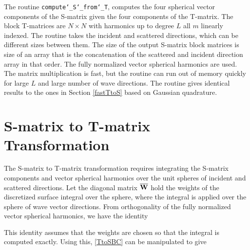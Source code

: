 The routine \texttt{compute\char`_S\char`_from\char`_T}, computes the four spherical vector components of the S-matrix given the four components of the T-matrix. The block T-matrices are $N \times N$ with harmonics up to degree $L$ all $m$ linearly indexed. The routine takes the incident and scattered directions, which can be different sizes between them. The size of the output S-matrix block matrices is size of an array that is the concatenation of the scattered and incident direction array in that order. The fully normalized vector spherical harmonics are used. The matrix multiplication is fast, but the routine can run out of memory quickly for large $L$ and large number of wave directions. The routine gives identical results to the ones in Section \ref{fastTtoS} based on Gaussian quadrature.

{\footnotesize
{}
}


\section{S-matrix to T-matrix Transformation}
\label{secStoT}

The S-matrix to T-matrix transformation requires integrating the S-matrix components and vector spherical harmonics over the unit spheres of incident and scattered directions. Let the diagonal matrix $\overline{\mathbf{W}}$ hold the weights of the discretized surface integral over the sphere, where the integral is applied over the sphere of wave vector directions. From orthogonality of the fully normalized vector spherical harmonics, we have the identity

This identity assumes that the weights are chosen so that the integral is computed exactly. Using this, \eqref{TtoSBC} can be manipulated to give


